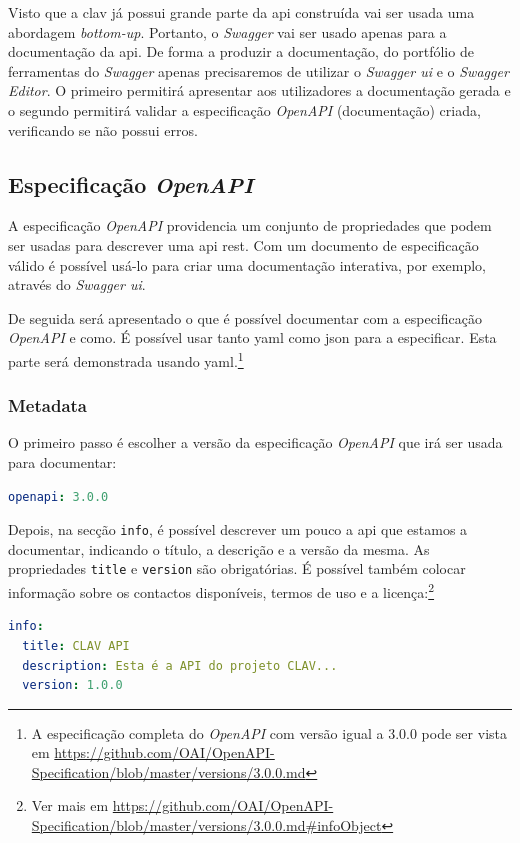 Visto que a \acrshort{clav} já possui grande parte da \acrshort{api} construída vai ser usada uma abordagem 
\textit{bottom-up}. Portanto, o \textit{Swagger} vai ser usado apenas para a documentação da \acrshort{api}. 
De forma a produzir a documentação, do portfólio de ferramentas do \textit{Swagger} apenas precisaremos de 
utilizar o \textit{Swagger \acrshort{ui}} e o \textit{Swagger Editor}. O primeiro permitirá apresentar aos 
utilizadores a documentação gerada e o segundo permitirá validar a especificação \textit{OpenAPI} (documentação) 
criada, verificando se não possui erros.

\subsection{Especificação \textit{OpenAPI}}

A especificação \textit{OpenAPI} providencia um conjunto de propriedades que podem ser usadas para descrever 
uma \acrshort{api} \acrshort{rest}. Com um documento de especificação válido é possível usá-lo para criar uma 
documentação interativa, por exemplo, através do \textit{Swagger \acrshort{ui}}.

De seguida será apresentado o que é possível documentar com a especificação \textit{OpenAPI} e como. 
É possível usar tanto \acrshort{yaml} como \acrshort{json} para a especificar. Esta parte será demonstrada 
usando \acrshort{yaml}.\footnote{A especificação completa do \textit{OpenAPI} com versão igual a 3.0.0 pode 
ser vista em \url{https://github.com/OAI/OpenAPI-Specification/blob/master/versions/3.0.0.md}}

\subsubsection{Metadata}
O primeiro passo é escolher a versão da especificação \textit{OpenAPI} que irá ser usada para documentar:
\begin{lstlisting}[language=yaml, caption=Exemplo de indicação da versão da especificação \textit{OpenAPI}]
openapi: 3.0.0
\end{lstlisting}

Depois, na secção \texttt{info}, é possível descrever um pouco a \acrshort{api} que estamos a documentar, 
indicando o título, a descrição e a versão da mesma. As propriedades \texttt{title} e \texttt{version} são 
obrigatórias. É possível também colocar informação sobre os contactos disponíveis, termos de uso e a 
licença:\footnote{Ver mais em \url{https://github.com/OAI/OpenAPI-Specification/blob/master/versions/3.0.0.md\#infoObject}}
\begin{lstlisting}[language=yaml, caption={Exemplo de secção \texttt{info} indicando título, descrição e versão da \acrshort{api} na especificação \textit{OpenAPI}}]
info:
  title: CLAV API
  description: Esta é a API do projeto CLAV...
  version: 1.0.0
\end{lstlisting}


